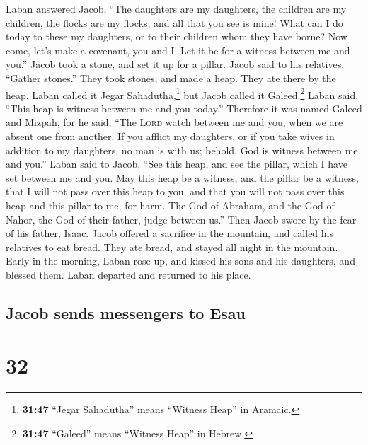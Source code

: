  Laban answered Jacob, ``The daughters are my daughters,
the children are my children, the flocks are my flocks, and all that you
see is mine! What can I do today to these my daughters, or to their
children whom they have borne?  Now come, let's make a
covenant, you and I. Let it be for a witness between me and you.''
 Jacob took a stone, and set it up for a pillar.
 Jacob said to his relatives, ``Gather stones.'' They
took stones, and made a heap. They ate there by the heap.
 Laban called it Jegar Sahadutha,\footnote{\textbf{31:47}
  ``Jegar Sahadutha'' means ``Witness Heap'' in Aramaic.} but Jacob
called it Galeed.\footnote{\textbf{31:47} ``Galeed'' means ``Witness
  Heap'' in Hebrew.}  Laban said, ``This heap is witness
between me and you today.'' Therefore it was named Galeed
 and Mizpah, for he said, ``The \textsc{Lord} watch
between me and you, when we are absent one from another. 
If you afflict my daughters, or if you take wives in addition to my
daughters, no man is with us; behold, God is witness between me and
you.''  Laban said to Jacob, ``See this heap, and see the
pillar, which I have set between me and you.  May this
heap be a witness, and the pillar be a witness, that I will not pass
over this heap to you, and that you will not pass over this heap and
this pillar to me, for harm.  The God of Abraham, and the
God of Nahor, the God of their father, judge between us.'' Then Jacob
swore by the fear of his father, Isaac.  Jacob offered a
sacrifice in the mountain, and called his relatives to eat bread. They
ate bread, and stayed all night in the mountain.  Early
in the morning, Laban rose up, and kissed his sons and his daughters,
and blessed them. Laban departed and returned to his place.

\hypertarget{jacob-sends-messengers-to-esau}{%
\subsection{Jacob sends messengers to
Esau}\label{jacob-sends-messengers-to-esau}}

\hypertarget{section-31}{%
\section{32}\label{section-31}}


